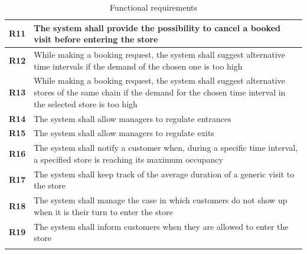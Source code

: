 \documentclass[a4paper,oneside,11pt]{book}
\begin{document}
\begin{longtable}[c]{|>{\bfseries{}}c|H{.65\textwidth}|}
        R11 & The system shall provide the possibility to cancel a booked visit before entering the store \\ \hline
        R12 & While making a booking request, the system shall suggest alternative time intervals if the demand of the chosen one is too high \\ \hline
        R13 & While making a booking request, the system shall suggest alternative stores of the same chain if the demand for the chosen time interval in the selected store is too high \\ \hline
        R14 & The system shall allow managers to regulate entrances \\ \hline
        R15 & The system shall allow managers to regulate exits \\ \hline
        R16 & The system shall notify a customer when, during a specific time interval, a specified store is reaching its maximum occupancy \\ \hline
        R17 & The system shall keep track of the average duration of a generic visit to the store \\ \hline
        R18 & The system shall manage the case in which customers do not show up when it is their turn to enter the store \\ \hline
        R19 & The system shall inform customers when they are allowed to enter the store \\ \hline
        \caption{Functional requirements}
        \label{table:functional_requirements}
    \end{longtable}
    
\end{document}
